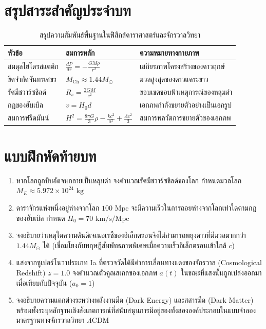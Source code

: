 \section{สรุปสาระสำคัญประจำบท}

\begin{table}[H]
\centering
\caption{สรุปความสัมพันธ์พื้นฐานในฟิสิกส์ดาราศาสตร์และจักรวาลวิทยา}
\label{tab:astrophysics_summary}
\small
\begin{tabularx}{\textwidth}{l >{\centering\arraybackslash}p{4.2cm} Y}
\toprule
\textbf{หัวข้อ} & \textbf{สมการหลัก} & \textbf{ความหมายทางกายภาพ} \\
\midrule
สมดุลไฮโดรสแตติก & $\frac{dP}{dr} = -\frac{GM\rho}{r^2}$ & เสถียรภาพโครงสร้างของดาวฤกษ์ \\
ขีดจำกัดจันทรเศขร & $M_{\text{Ch}} \approx 1.44 M_\odot$ & มวลสูงสุดของดาวแคระขาว \\
รัศมีชวาร์ซชิลด์ & $R_s = \frac{2GM}{c^2}$ & ขอบเขตขอบฟ้าเหตุการณ์ของหลุมดำ \\
กฎของฮับเบิล & $v = H_0 d$ & เอกภพกำลังขยายตัวอย่างเป็นเอกรูป \\
สมการฟรีดมันน์ & $H^2 = \frac{8\pi G}{3}\rho - \frac{kc^2}{a^2} + \frac{\Lambda c^2}{3}$ & สมการพลวัตการขยายตัวของเอกภพ \\
\bottomrule
\end{tabularx}
\end{table}

\section{แบบฝึกหัดท้ายบท}
\begin{enumerate}
    \item หากโลกถูกบีบอัดจนกลายเป็นหลุมดำ จงคำนวณรัศมีชวาร์ซชิลด์ของโลก กำหนดมวลโลก $M_E \approx 5.972 \times 10^{24}\text{ kg}$
    \item ดาราจักรแห่งหนึ่งอยู่ห่างจากโลก $100\text{ Mpc}$ จะมีความเร็วในการถอยห่างจากโลกเท่าใดตามกฎของฮับเบิล กำหนด $H_0 = 70\text{ km/s/Mpc}$
    \item จงอธิบายว่าเหตุใดความดันดีเจเนอเรซีของอิเล็กตรอนจึงไม่สามารถพยุงดาวที่มีมวลมากกว่า $1.44 M_\odot$ ได้ (เชื่อมโยงกับทฤษฎีสัมพัทธภาพพิเศษเมื่อความเร็วอิเล็กตรอนเข้าใกล้ $c$)
    \item แสงจากซูเปอร์โนวาประเภท Ia ที่ตรวจวัดได้มีค่าการเลื่อนทางแดงของจักรวาล (Cosmological Redshift) $z = 1.0$ จงคำนวณตัวคูณสเกลของเอกภพ $a(t)$ ในขณะที่แสงนั้นถูกเปล่งออกมาเมื่อเทียบกับปัจจุบัน ($a_0 = 1$)
    \item จงอธิบายความแตกต่างระหว่างพลังงานมืด (Dark Energy) และสสารมืด (Dark Matter) พร้อมทั้งระบุหลักฐานเชิงสังเกตการณ์ที่สนับสนุนการมีอยู่ของทั้งสององค์ประกอบในแบบจำลองมาตรฐานทางจักรวาลวิทยา $\Lambda\text{CDM}$
\end{enumerate}
